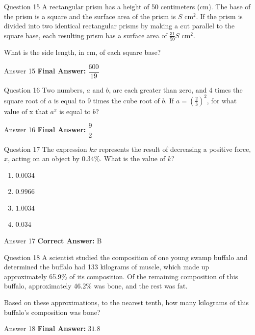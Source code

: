 \documentclass{beamer}
\begin{document}
\begin{frame}{Question 15}
\small
A rectangular prism has a height of 50 centimeters (cm). The base of the prism is a square and the surface area of the prism is \( S \) cm\(^2\).  
If the prism is divided into two identical rectangular prisms by making a cut parallel to the square base, each resulting prism has a surface area of \(\frac{31}{50} S\) cm\(^2\).  

What is the side length, in cm, of each square base?
\end{frame}
\begin{frame}{Answer 15}
\small
\textbf{Final Answer:} $\boxed{\dfrac{600}{19}}$
\end{frame}

\begin{frame}{Question 16}
\small
Two numbers, \( a \) and \( b \), are each greater than zero, and 4 times the square root of \( a \) is equal to 9 times the cube root of \( b \).  
If \( a = \left(\frac{2}{3}\right)^2 \), for what value of x that \( a^x \) is equal to \( b \)?
\end{frame}
\begin{frame}{Answer 16}
\small
\textbf{Final Answer:} $\boxed{\dfrac{9}{2}}$
\end{frame}

\begin{frame}{Question 17}
\small
The expression \( kx \) represents the result of decreasing a positive force, \( x \), acting on an object by \( 0.34\% \). What is the value of \( k \)?
\vspace{0.35cm}
\begin{enumerate}
    \item[A.] \( 0.0034 \)
    \item[B.] \( 0.9966 \)
    \item[C.] \( 1.0034 \)
    \item[D.] \( 0.034 \)
\end{enumerate}
\end{frame}
\begin{frame}{Answer 17}
\small
\textbf{Correct Answer:} B
\end{frame}

\begin{frame}{Question 18}
\small
A scientist studied the composition of one young swamp buffalo and determined the buffalo had 133 kilograms of muscle, which made up approximately 65.9\% of its composition. Of the remaining composition of this buffalo, approximately 46.2\% was bone, and the rest was fat.  

Based on these approximations, to the nearest tenth, how many kilograms of this buffalo’s composition was bone?
\end{frame}
\begin{frame}{Answer 18}
\small
\textbf{Final Answer:} $\boxed{31.8}$
\end{frame}
\end{document}
